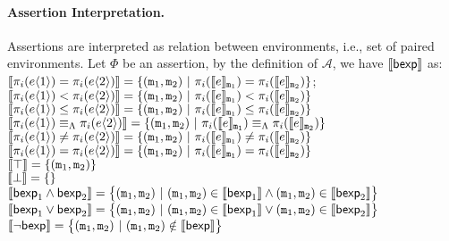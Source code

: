 \documentclass[a4paper,11pt]{article}
\begin{document}
\paragraph{Assertion Interpretation.} Assertions are interpreted as relation between environments, i.e., set of paired environments. Let $\Phi$ be an assertion,
%
by the definition of $\mathcal{A}$, we have $\llbracket \mathsf{bexp} \rrbracket$ as:
\\
$\llbracket \pi_i(e\langle 1 \rangle) 
= \pi_i(e\langle 2 \rangle) \rrbracket = 
\{(\mathtt{m}_1, \mathtt{m}_2) ~|~ \pi_{i}(\llbracket e \rrbracket_{\mathtt{m}_{1}}) 
= \pi_i(\llbracket e \rrbracket_{\mathtt{m}_2}) \}$;
%
\\
$\llbracket \pi_i(e\langle 1 \rangle) 
< \pi_i(e\langle 2 \rangle) \rrbracket = 
\{(\mathtt{m}_1, \mathtt{m}_2) ~|~ \pi_{i}(\llbracket e \rrbracket_{\mathtt{m}_{1}}) 
< \pi_i(\llbracket e \rrbracket_{\mathtt{m}_2}) \}$
%
\\
$\llbracket \pi_i(e\langle 1 \rangle) 
\leq \pi_i(e\langle 2 \rangle) \rrbracket = 
\{(\mathtt{m}_1, \mathtt{m}_2) ~|~ \pi_{i}(\llbracket e \rrbracket_{\mathtt{m}_{1}}) 
\leq \pi_i(\llbracket e \rrbracket_{\mathtt{m}_2}) \}$
%
\\
$\llbracket \pi_i(e\langle 1 \rangle) 
\equiv_{\Lambda} \pi_i(e\langle 2 \rangle) \rrbracket = 
\{(\mathtt{m}_1, \mathtt{m}_2) ~|~ \pi_{i}(\llbracket e \rrbracket_{\mathtt{m}_{1}}) 
\equiv_{\Lambda} \pi_i(\llbracket e \rrbracket_{\mathtt{m}_2}) \}$
%
\\
$\llbracket \pi_i(e\langle 1 \rangle) 
\neq \pi_i(e\langle 2 \rangle) \rrbracket = 
\{(\mathtt{m}_1, \mathtt{m}_2) ~|~ \pi_{i}(\llbracket e \rrbracket_{\mathtt{m}_{1}}) 
\neq \pi_i(\llbracket e \rrbracket_{\mathtt{m}_2}) \}$
%
\\
$\llbracket \pi_i(e\langle 1 \rangle) 
= \pi_i(e\langle 2 \rangle) \rrbracket = 
\{(\mathtt{m}_1, \mathtt{m}_2) ~|~ \pi_{i}(\llbracket e \rrbracket_{\mathtt{m}_{1}}) 
= \pi_i(\llbracket e \rrbracket_{\mathtt{m}_2}) \}$
%
\\
$\llbracket \top \rrbracket = \{(\mathtt{m}_1, \mathtt{m}_2)\}$
%
\\
$\llbracket \bot \rrbracket = \{\}$
%
\\
$\llbracket \mathsf{bexp}_1 \land \mathsf{bexp}_2 \rrbracket = \big\{(\mathtt{m}_1, \mathtt{m}_2)
~|~ (\mathtt{m}_1, \mathtt{m}_2) \in \llbracket \mathsf{bexp}_1 \rrbracket \land 
	(\mathtt{m}_1, \mathtt{m}_2) \in \llbracket \mathsf{bexp}_2 \rrbracket \big\}$
%
\\
$\llbracket \mathsf{bexp}_1 \lor \mathsf{bexp}_2 \rrbracket = \big\{(\mathtt{m}_1, \mathtt{m}_2)
~|~ (\mathtt{m}_1, \mathtt{m}_2) \in \llbracket \mathsf{bexp}_1 \rrbracket \lor 
	(\mathtt{m}_1, \mathtt{m}_2) \in \llbracket \mathsf{bexp}_2 \rrbracket \big\}$
%
\\
$\llbracket \neg \mathsf{bexp} \rrbracket = \big\{(\mathtt{m}_1, \mathtt{m}_2)
~|~ (\mathtt{m}_1, \mathtt{m}_2) \notin \llbracket \mathsf{bexp} \rrbracket \big\}$
%
%
\end{document}
